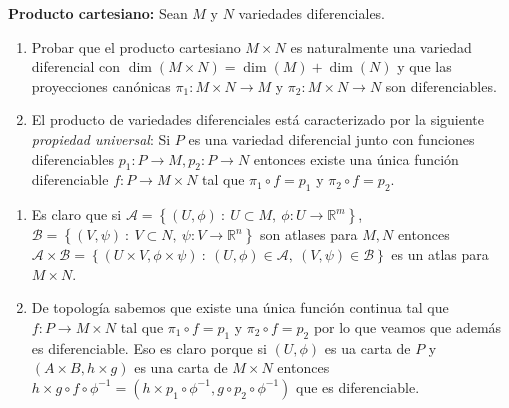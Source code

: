 \documentclass[11pt]{article}
\newcommand{\B}{\mathcal{B}}
\newcommand{\A}{\mathcal{A}}
\newcommand{\R}{{\mathbb{R}}}
\newcommand\tq{~:~}
\newcommand{\sett}[1]{\left\lbrace#1\right\rbrace}
\numberwithin{theorem}{subsection}
\newcommand{\qed}{\nobreak \ifvmode \relax \else
	\ifdim\lastskip<1.5em \hskip-\lastskip
	\hskip1.5em plus0em minus0.5em \fi \nobreak
	\vrule height0.75em width0.5em depth0.25em\fi}
\begin{document}
\begin{question}\textbf{Producto cartesiano:} Sean $M$ y $N$ variedades diferenciales.
	\begin{enumerate}
		\item Probar que el producto cartesiano $M\times N$ es naturalmente una variedad diferencial con $\dim(M\times N)=\dim(M)+\dim(N)$ y que las proyecciones can\'onicas $\pi_1:M\times N\to M$ y $\pi_2:M\times N\to N$ son diferenciables. 
		
		\item El producto de variedades diferenciales est\'a caracterizado por la siguiente \textit{propiedad universal}: Si $P$ es una variedad diferencial junto con funciones diferenciables $p_1:P\to M, p_2:P\to N$ entonces existe una \'unica funci\'on diferenciable $f:P\to M\times N$ tal que $\pi_1\circ f = p_1$ y $\pi_2\circ f = p_2$.
	\end{enumerate}
\end{question}

\begin{solution}
	\begin{enumerate}
		\item Es claro que si $\A = \sett{(U,\phi) \tq U \subset M, \ \phi: U \rightarrow \R^m}$, $\B = \sett{(V,\psi) \tq V \subset N, \ \psi: V \rightarrow \R^n}$ son atlases para $M,N$ entonces $\A \times \B = \sett{(U \times V,\phi \times \psi) \tq (U,\phi) \in \A, \ (V, \psi) \in \B}$ es un atlas para $M \times N$.
		\item De topolog\'ia sabemos que existe una \'unica funci\'on continua tal que $f:P\to M\times N$ tal que $\pi_1\circ f = p_1$ y $\pi_2\circ f = p_2$ por lo que veamos que adem\'as es diferenciable. Eso es claro porque si $(U,\phi)$ es ua carta de $P$ y $(A \times B, h \times g)$ es una carta de $M \times N$ entonces $h \times g \circ f \circ \phi^{-1} = (h \times p_1 \circ \phi^{-1}, g \circ p_2 \circ \phi^{-1})$ que es diferenciable. \qed
	\end{enumerate}
\end{solution}
\end{document}
